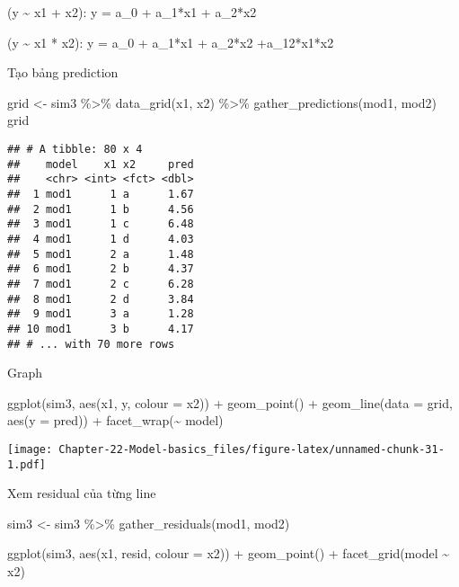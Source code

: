 \documentclass[
]{article}
\newenvironment{Shaded}{\begin{snugshade}}{\end{snugshade}}
\newcommand{\AttributeTok}[1]{\textcolor[rgb]{0.77,0.63,0.00}{#1}}
\newcommand{\FunctionTok}[1]{\textcolor[rgb]{0.00,0.00,0.00}{#1}}
\newcommand{\NormalTok}[1]{#1}
\newcommand{\OtherTok}[1]{\textcolor[rgb]{0.56,0.35,0.01}{#1}}
\newcommand{\SpecialCharTok}[1]{\textcolor[rgb]{0.00,0.00,0.00}{#1}}
\begin{document}
(y \textasciitilde{} x1 + x2): y = a\_0 + a\_1*x1 + a\_2*x2

(y \textasciitilde{} x1 * x2): y = a\_0 + a\_1*x1 + a\_2*x2 +a\_12*x1*x2

Tạo bảng prediction

\begin{Shaded}
\begin{Highlighting}[]
\NormalTok{grid }\OtherTok{\textless{}{-}}\NormalTok{ sim3 }\SpecialCharTok{\%\textgreater{}\%} 
  \FunctionTok{data\_grid}\NormalTok{(x1, x2) }\SpecialCharTok{\%\textgreater{}\%} 
  \FunctionTok{gather\_predictions}\NormalTok{(mod1, mod2)}
\NormalTok{grid}
\end{Highlighting}
\end{Shaded}

\begin{verbatim}
## # A tibble: 80 x 4
##    model    x1 x2     pred
##    <chr> <int> <fct> <dbl>
##  1 mod1      1 a      1.67
##  2 mod1      1 b      4.56
##  3 mod1      1 c      6.48
##  4 mod1      1 d      4.03
##  5 mod1      2 a      1.48
##  6 mod1      2 b      4.37
##  7 mod1      2 c      6.28
##  8 mod1      2 d      3.84
##  9 mod1      3 a      1.28
## 10 mod1      3 b      4.17
## # ... with 70 more rows
\end{verbatim}

Graph

\begin{Shaded}
\begin{Highlighting}[]
\FunctionTok{ggplot}\NormalTok{(sim3, }\FunctionTok{aes}\NormalTok{(x1, y, }\AttributeTok{colour =}\NormalTok{ x2)) }\SpecialCharTok{+} 
  \FunctionTok{geom\_point}\NormalTok{() }\SpecialCharTok{+} 
  \FunctionTok{geom\_line}\NormalTok{(}\AttributeTok{data =}\NormalTok{ grid, }\FunctionTok{aes}\NormalTok{(}\AttributeTok{y =}\NormalTok{ pred)) }\SpecialCharTok{+} 
  \FunctionTok{facet\_wrap}\NormalTok{(}\SpecialCharTok{\textasciitilde{}}\NormalTok{ model)}
\end{Highlighting}
\end{Shaded}

\texttt{[image: Chapter-22-Model-basics\_files/figure-latex/unnamed-chunk-31-1.pdf]}

Xem residual của từng line

\begin{Shaded}
\begin{Highlighting}[]
\NormalTok{sim3 }\OtherTok{\textless{}{-}}\NormalTok{ sim3 }\SpecialCharTok{\%\textgreater{}\%} 
  \FunctionTok{gather\_residuals}\NormalTok{(mod1, mod2)}

\FunctionTok{ggplot}\NormalTok{(sim3, }\FunctionTok{aes}\NormalTok{(x1, resid, }\AttributeTok{colour =}\NormalTok{ x2)) }\SpecialCharTok{+} 
  \FunctionTok{geom\_point}\NormalTok{() }\SpecialCharTok{+} 
  \FunctionTok{facet\_grid}\NormalTok{(model }\SpecialCharTok{\textasciitilde{}}\NormalTok{ x2)}
\end{Highlighting}
\end{Shaded}
\end{document}
